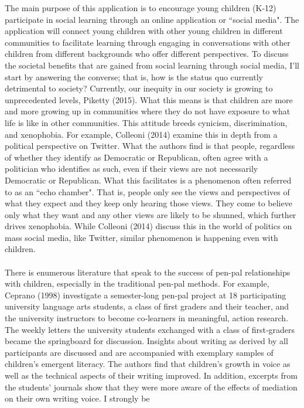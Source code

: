 \documentclass[12pt, final]{article}
\begin{document}
The main purpose of this application is to encourage young children (K-12) participate in social learning through an online application or ``social media". The application will connect young children with other young children in different communities to facilitate learning through engaging in conversations with other children from different backgrounds who offer different perspectives. To discuss the societal benefits that are gained from social learning through social media, I'll start by answering the converse; that is, how is the status quo currently detrimental to society? Currently, our inequity in our society is growing to unprecedented levels, Piketty (2015). What this means is that children are more and more growing up in communities where they do not have exposure to what life is like in other communities. This attitude breeds cynicism, discrimination, and xenophobia. For example, Colleoni (2014) examine this in depth from a political perspective on Twitter. What the authors find is that people, regardless of whether they identify as Democratic or Republican, often agree with a politician who identifies as such, even if their views are not necessarily Democratic or Republican. What this facilitates is a phenomenon often referred to as an ``echo chamber". That is, people only see the views and perspectives of what they expect and they keep only hearing those views. They come to believe only what they want and any other views are likely to be shunned, which further drives xenophobia. While Colleoni (2014) discuss this in the world of politics on mass social media, like Twitter, similar phenomenon is happening even with children. 
\\
\\
There is enumerous literature that speak to the success of pen-pal relationships with children, especially in the traditional pen-pal methods. For example, Ceprano (1998) investigate a semester-long pen-pal project at 18 participating university language arts students, a class of first graders and their teacher, and the university instructors to become co‐learners in meaningful, action research. The weekly letters the university students exchanged with a class of first‐graders became the springboard for discussion. Insights about writing as derived by all participants are discussed and are accompanied with exemplary samples of children's emergent literacy. The authors find that children's growth in voice as well as the technical aspects of their writing improved. In addition, excerpts from the students' journals show that they were more aware of the effects of mediation on their own writing voice. I strongly be
\end{document}
